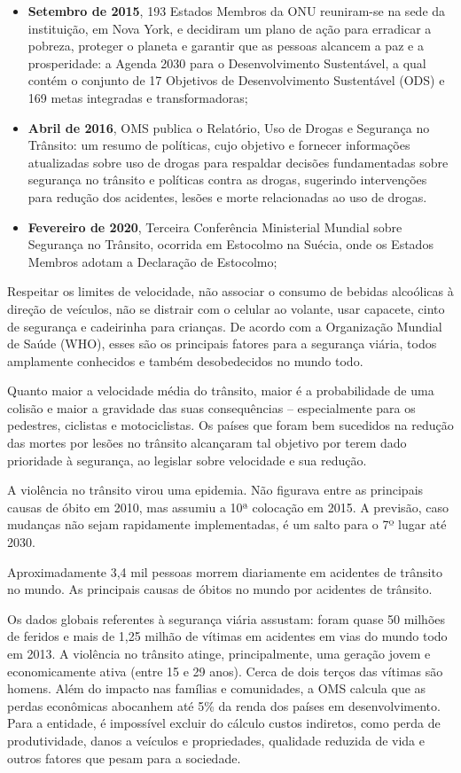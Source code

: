 \documentclass[output=paper,colorlinks,citecolor=green]{langscibook}
\begin{document}
\begin{itemize}
\item \textbf{Setembro de 2015}, 193 Estados Membros da ONU reuniram-se na sede da instituição, em Nova York, e decidiram um plano de ação para erradicar a pobreza, proteger o planeta e garantir que as pessoas alcancem a paz e a prosperidade: a Agenda 2030 para o Desenvolvimento Sustentável, a qual contém o conjunto de 17 Objetivos de Desenvolvimento Sustentável (ODS) e 169 metas integradas e transformadoras;
\item \textbf{Abril de 2016}, OMS publica o Relatório, Uso de Drogas e Segurança no Trânsito: um resumo de políticas, cujo objetivo e fornecer informações atualizadas sobre uso de drogas para respaldar decisões fundamentadas sobre segurança no trânsito e políticas contra as drogas, sugerindo intervenções para redução dos acidentes, lesões e morte relacionadas ao uso de drogas.
\item \textbf{Fevereiro de 2020}, Terceira Conferência Ministerial Mundial sobre Segurança no Trânsito, ocorrida em Estocolmo na Suécia, onde os Estados Membros adotam a Declaração de Estocolmo;
\end{itemize}

Respeitar os limites de velocidade, não associar o consumo de bebidas alcoólicas à direção de veículos, não se distrair com o celular ao volante, usar capacete, cinto de segurança e cadeirinha para crianças. De acordo com a Organização Mundial de Saúde (WHO), esses são os principais fatores para a segurança viária, todos amplamente conhecidos e também desobedecidos no mundo todo.\vskip0.3cm

Quanto maior a velocidade média do trânsito, maior é a probabilidade de uma colisão e maior a gravidade das suas consequências – especialmente para os pedestres, ciclistas e motociclistas. Os países que foram bem sucedidos na redução das mortes por lesões no trânsito alcançaram tal objetivo por terem dado prioridade à segurança, ao legislar sobre velocidade e sua redução.\vskip0.3cm


\newpage
A violência no trânsito virou uma epidemia. Não figurava entre as principais causas de óbito em 2010, mas assumiu a 10ª colocação em 2015. A previsão, caso mudanças não sejam rapidamente implementadas, é um salto para o 7º lugar até 2030.\vskip0.3cm

Aproximadamente 3,4 mil pessoas morrem diariamente em acidentes de trânsito no mundo. As principais causas de óbitos no mundo por acidentes de trânsito.\vskip0.3cm

Os dados globais referentes à segurança viária assustam: foram quase 50 milhões de feridos e mais de 1,25 milhão de vítimas em acidentes em vias do mundo todo em 2013. A violência no trânsito atinge, principalmente, uma geração jovem e economicamente ativa (entre 15 e 29 anos). Cerca de dois terços das vítimas são homens. Além do impacto nas famílias e comunidades, a OMS calcula que as perdas econômicas abocanhem até 5\% da renda dos países em desenvolvimento. Para a entidade, é impossível excluir do cálculo custos indiretos, como perda de produtividade, danos a veículos e propriedades, qualidade reduzida de vida e outros fatores que pesam para a sociedade.\vskip0.3cm
\end{document}

